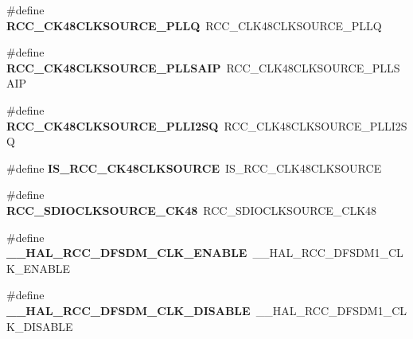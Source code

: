 \begin{DoxyCompactItemize}
\item 
\mbox{\label{group___h_a_l___r_c_c___aliased_gaa6fb44c10b1f09d8ab50800d1ab7f4dd}} 
\#define {\bfseries R\+C\+C\+\_\+\+C\+K48\+C\+L\+K\+S\+O\+U\+R\+C\+E\+\_\+\+P\+L\+LQ}~R\+C\+C\+\_\+\+C\+L\+K48\+C\+L\+K\+S\+O\+U\+R\+C\+E\+\_\+\+P\+L\+LQ
\item 
\mbox{\label{group___h_a_l___r_c_c___aliased_ga61428387bb2476bd23229e8dc92570cd}} 
\#define {\bfseries R\+C\+C\+\_\+\+C\+K48\+C\+L\+K\+S\+O\+U\+R\+C\+E\+\_\+\+P\+L\+L\+S\+A\+IP}~R\+C\+C\+\_\+\+C\+L\+K48\+C\+L\+K\+S\+O\+U\+R\+C\+E\+\_\+\+P\+L\+L\+S\+A\+IP
\item 
\mbox{\label{group___h_a_l___r_c_c___aliased_ga7db3e05aa1e7a903e92ed57a5d9c1c06}} 
\#define {\bfseries R\+C\+C\+\_\+\+C\+K48\+C\+L\+K\+S\+O\+U\+R\+C\+E\+\_\+\+P\+L\+L\+I2\+SQ}~R\+C\+C\+\_\+\+C\+L\+K48\+C\+L\+K\+S\+O\+U\+R\+C\+E\+\_\+\+P\+L\+L\+I2\+SQ
\item 
\mbox{\label{group___h_a_l___r_c_c___aliased_gadc3701af78409a4623aa3462d5c18916}} 
\#define {\bfseries I\+S\+\_\+\+R\+C\+C\+\_\+\+C\+K48\+C\+L\+K\+S\+O\+U\+R\+CE}~I\+S\+\_\+\+R\+C\+C\+\_\+\+C\+L\+K48\+C\+L\+K\+S\+O\+U\+R\+CE
\item 
\mbox{\label{group___h_a_l___r_c_c___aliased_ga9ef0bc577f0de24e85e10db1751ff5c7}} 
\#define {\bfseries R\+C\+C\+\_\+\+S\+D\+I\+O\+C\+L\+K\+S\+O\+U\+R\+C\+E\+\_\+\+C\+K48}~R\+C\+C\+\_\+\+S\+D\+I\+O\+C\+L\+K\+S\+O\+U\+R\+C\+E\+\_\+\+C\+L\+K48
\item 
\mbox{\label{group___h_a_l___r_c_c___aliased_gad3863899a558adce00ea80316fc21e8b}} 
\#define {\bfseries \+\_\+\+\_\+\+H\+A\+L\+\_\+\+R\+C\+C\+\_\+\+D\+F\+S\+D\+M\+\_\+\+C\+L\+K\+\_\+\+E\+N\+A\+B\+LE}~\+\_\+\+\_\+\+H\+A\+L\+\_\+\+R\+C\+C\+\_\+\+D\+F\+S\+D\+M1\+\_\+\+C\+L\+K\+\_\+\+E\+N\+A\+B\+LE
\item 
\mbox{\label{group___h_a_l___r_c_c___aliased_ga2ac6a3d5b835993a5ecd5d3e384f936a}} 
\#define {\bfseries \+\_\+\+\_\+\+H\+A\+L\+\_\+\+R\+C\+C\+\_\+\+D\+F\+S\+D\+M\+\_\+\+C\+L\+K\+\_\+\+D\+I\+S\+A\+B\+LE}~\+\_\+\+\_\+\+H\+A\+L\+\_\+\+R\+C\+C\+\_\+\+D\+F\+S\+D\+M1\+\_\+\+C\+L\+K\+\_\+\+D\+I\+S\+A\+B\+LE

\end{DoxyCompactItemize}
